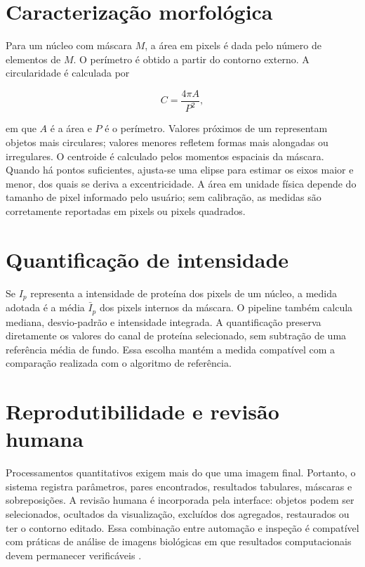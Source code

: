 \section{Caracterização morfológica}

Para um núcleo com máscara $M$, a área em pixels é dada pelo número de elementos de $M$. O perímetro é obtido a partir do contorno externo. A circularidade é calculada por

\begin{equation}
    C = \frac{4\pi A}{P^2},
\end{equation}

em que $A$ é a área e $P$ é o perímetro. Valores próximos de um representam objetos mais circulares; valores menores refletem formas mais alongadas ou irregulares. O centroide é calculado pelos momentos espaciais da máscara. Quando há pontos suficientes, ajusta-se uma elipse para estimar os eixos maior e menor, dos quais se deriva a excentricidade. A área em unidade física depende do tamanho de pixel informado pelo usuário; sem calibração, as medidas são corretamente reportadas em pixels ou pixels quadrados.

\section{Quantificação de intensidade}

Se $I_p$ representa a intensidade de proteína dos pixels de um núcleo, a medida adotada é a média $\bar{I}_p$ dos pixels internos da máscara. O pipeline também calcula mediana, desvio-padrão e intensidade integrada. A quantificação preserva diretamente os valores do canal de proteína selecionado, sem subtração de uma referência média de fundo. Essa escolha mantém a medida compatível com a comparação realizada com o algoritmo de referência.

\section{Reprodutibilidade e revisão humana}

Processamentos quantitativos exigem mais do que uma imagem final. Portanto, o sistema registra parâmetros, pares encontrados, resultados tabulares, máscaras e sobreposições. A revisão humana é incorporada pela interface: objetos podem ser selecionados, ocultados da visualização, excluídos dos agregados, restaurados ou ter o contorno editado. Essa combinação entre automação e inspeção é compatível com práticas de análise de imagens biológicas em que resultados computacionais devem permanecer verificáveis \cite{Carpenter2006,Schindelin2012}.
